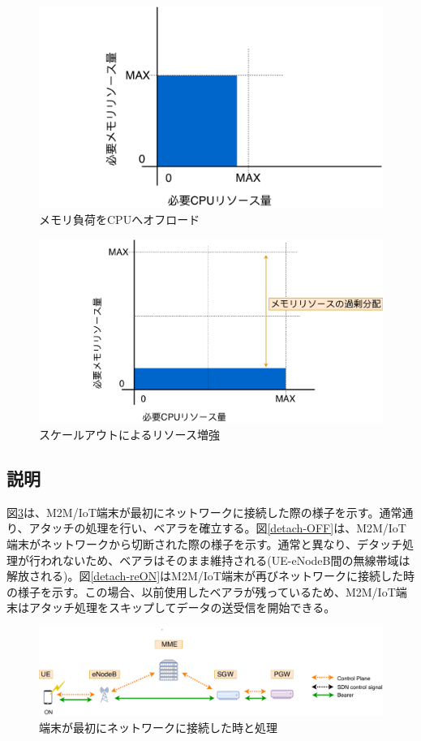 \documentclass[a4j]{ujarticle}
\begin{document}
\begin{figure}[htbp]
	\centering
	\includegraphics[width=0.7\hsize]{okmemory.pdf}
  \caption{メモリ負荷をCPUへオフロード}
	\label{okmemory}
\end{figure}

\begin{figure}[htbp]
	\centering
	\includegraphics[width=0.7\hsize]{scaleout.pdf}
  \caption{スケールアウトによるリソース増強}
	\label{scaleout}
\end{figure}


\subsection{説明}
図\ref{detach-ON}は、M2M/IoT端末が最初にネットワークに接続した際の様子を示す。通常通り、アタッチの処理を行い、ベアラを確立する。図\ref{detach-OFF}は、M2M/IoT端末がネットワークから切断された際の様子を示す。通常と異なり、デタッチ処理が行われないため、ベアラはそのまま維持される(UE-eNodeB間の無線帯域は解放される)。図\ref{detach-reON}はM2M/IoT端末が再びネットワークに接続した時の様子を示す。この場合、以前使用したベアラが残っているため、M2M/IoT端末はアタッチ処理をスキップしてデータの送受信を開始できる。

\begin{figure}[htbp]
	\centering
	\includegraphics[width=0.7\hsize]{detach-ON.pdf}
  \caption{端末が最初にネットワークに接続した時と処理}
	\label{detach-ON}
\end{figure}
\end{document}
